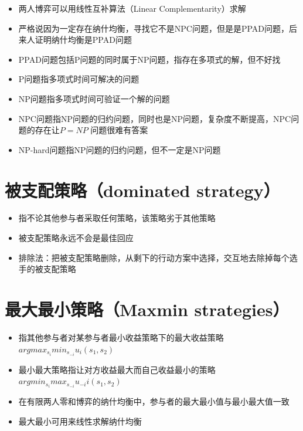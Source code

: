 \documentclass[]{book}
\providecommand{\tightlist}{%
  \setlength{\itemsep}{0pt}\setlength{\parskip}{0pt}}
\begin{document}
\begin{itemize}
\tightlist
\item
  两人博弈可以用线性互补算法（Linear Complementarity）求解
\item
  严格说因为一定存在纳什均衡，寻找它不是NPC问题，但是是PPAD问题，后来人证明纳什均衡是PPAD问题
\item
  PPAD问题包括P问题的同时属于NP问题，指存在多项式的解，但不好找
\item
  P问题指多项式时间可解决的问题
\item
  NP问题指多项式时间可验证一个解的问题
\item
  NPC问题指NP问题的归约问题，同时也是NP问题，复杂度不断提高，NPC问题的存在让\(P = NP\) 问题很难有答案
\item
  NP-hard问题指NP问题的归约问题，但不一定是NP问题
\end{itemize}

\hypertarget{ux88abux652fux914dux7b56ux7565dominated-strategy}{%
\section{被支配策略（dominated strategy）}\label{ux88abux652fux914dux7b56ux7565dominated-strategy}}

\begin{itemize}
\tightlist
\item
  指不论其他参与者采取任何策略，该策略劣于其他策略
\item
  被支配策略永远不会是最佳回应
\item
  排除法：把被支配策略删除，从剩下的行动方案中选择，交互地去除掉每个选手的被支配策略
\end{itemize}

\hypertarget{ux6700ux5927ux6700ux5c0fux7b56ux7565maxmin-strategies}{%
\section{最大最小策略（Maxmin strategies）}\label{ux6700ux5927ux6700ux5c0fux7b56ux7565maxmin-strategies}}

\begin{itemize}
\tightlist
\item
  指其他参与者对某参与者最小收益策略下的最大收益策略\(arg max_{s_i}min_{s_{-i}}u_i(s_1,s_2)\)
\item
  最小最大策略指让对方收益最大而自己收益最小的策略\(arg min_{s_i}max_{s_{-i}}u_{-i}i(s_1,s_2)\)
\item
  在有限两人零和博弈的纳什均衡中，参与者的最大最小值与最小最大值一致
\item
  最大最小可用来线性求解纳什均衡
\end{itemize}
\end{document}
